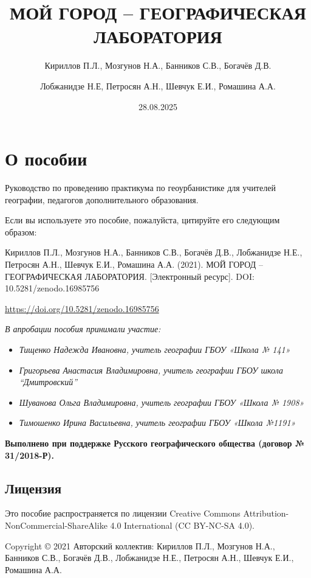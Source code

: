 \documentclass[
  11pt,
]{book}
\title{МОЙ ГОРОД -- ГЕОГРАФИЧЕСКАЯ ЛАБОРАТОРИЯ}
\author{Кириллов П.Л., Мозгунов Н.А., Банников С.В., Богачёв Д.В. \and Лобжанидзе Н.Е, Петросян А.Н., Шевчук Е.И., Ромашина А.А.}
\date{28.08.2025}
\providecommand{\tightlist}{%
  \setlength{\itemsep}{0pt}\setlength{\parskip}{0pt}}
\begin{document}
\maketitle

{
\hypersetup{linkcolor=}
\setcounter{tocdepth}{1}
\tableofcontents
}
\chapter*{О пособии}\label{ux43e-ux43fux43eux441ux43eux431ux438ux438}

Руководство по проведению практикума по геоурбанистике для учителей географии, педагогов дополнительного образования.

Если вы используете это пособие, пожалуйста, цитируйте его следующим образом:

Кириллов П.Л., Мозгунов Н.А., Банников С.В., Богачёв Д.В., Лобжанидзе Н.Е., Петросян А.Н., Шевчук Е.И., Ромашина А.А. (2021). МОЙ ГОРОД -- ГЕОГРАФИЧЕСКАЯ ЛАБОРАТОРИЯ. {[}Электронный ресурс{]}. DOI: 10.5281/zenodo.16985756

\url{https://doi.org/10.5281/zenodo.16985756}

\emph{В апробации пособия принимали участие:}

\begin{itemize}
\tightlist
\item
  \emph{Тищенко Надежда Ивановна, учитель географии ГБОУ «Школа № 141»}
\item
  \emph{Григорьева Анастасия Владимировна, учитель географии ГБОУ школа ``Дмитровский''}
\item
  \emph{Шуванова Ольга Владимировна, учитель географии ГБОУ «Школа № 1908»}
\item
  \emph{Тимошенко Ирина Васильевна, учитель географии ГБОУ «Школа №1191»}
\end{itemize}

\textbf{Выполнено при поддержке Русского географического общества (договор № 31/2018-Р).}

\section*{Лицензия}\label{ux43bux438ux446ux435ux43dux437ux438ux44f}

Это пособие распространяется по лицензии Creative Commons Attribution-NonCommercial-ShareAlike 4.0 International (CC BY-NC-SA 4.0).

Copyright © 2021 Авторский коллектив: Кириллов П.Л., Мозгунов Н.А., Банников С.В., Богачёв Д.В., Лобжанидзе Н.Е., Петросян А.Н., Шевчук Е.И., Ромашина А.А.
\end{document}
